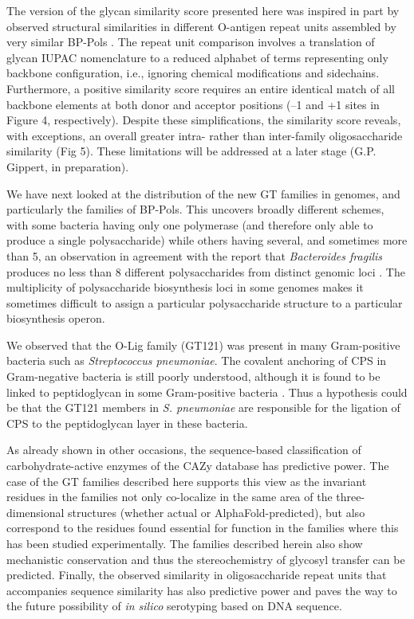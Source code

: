 \documentclass{article}
\begin{document}
The version of the glycan similarity score presented here was inspired in part by observed structural similarities in different O-antigen repeat units assembled by very similar BP-Pols \cite{islam_synthesis_2014}. The repeat unit comparison involves a translation of glycan IUPAC nomenclature to a reduced alphabet of terms representing only backbone configuration, i.e., ignoring chemical modifications and sidechains. Furthermore, a positive similarity score requires an entire identical match of all backbone elements at both donor and acceptor positions (–1 and +1 sites in Figure 4, respectively). Despite these simplifications, the similarity score reveals, with exceptions, an overall greater intra- rather than inter-family oligosaccharide similarity (Fig 5). These limitations will be addressed at a later stage (G.P. Gippert, in preparation).

We have next looked at the distribution of the new GT families in genomes, and particularly the families of BP-Pols. This uncovers broadly different schemes, with some bacteria having only one polymerase (and therefore only able to produce a single polysaccharide) while others having several, and sometimes more than 5, an observation in agreement with the report that \textit{Bacteroides fragilis} produces no less than 8 different polysaccharides from distinct genomic loci \cite{krinos_extensive_2001}. The multiplicity of polysaccharide biosynthesis loci in some genomes makes it sometimes difficult to assign a particular polysaccharide structure to a particular biosynthesis operon.

We observed that the O-Lig family (GT121) was present in many Gram-positive bacteria such as \textit{Streptococcus pneumoniae}. The covalent anchoring of CPS in Gram-negative bacteria is still poorly understood, although it is found to be linked to peptidoglycan in some Gram-positive bacteria \cite{whitfield_assembly_2020, paton_streptococcus_2019}. Thus a hypothesis could be that the GT121 members in \textit{S. pneumoniae} are responsible for the ligation of CPS to the peptidoglycan layer in these bacteria. 
 
As already shown in other occasions, the sequence-based classification of carbohydrate-active enzymes of the CAZy database has predictive power. The case of the GT families described here supports this view as the invariant residues in the families not only co-localize in the same area of the three-dimensional structures (whether actual or AlphaFold-predicted), but also correspond to the residues found essential for function in the families where this has been studied experimentally. The families described herein also show mechanistic conservation and thus the stereochemistry of glycosyl transfer can be predicted. Finally, the observed similarity in oligosaccharide repeat units that accompanies sequence similarity has also predictive power and paves the way to the future possibility of \textit{in silico} serotyping based on DNA sequence.
\end{document}
